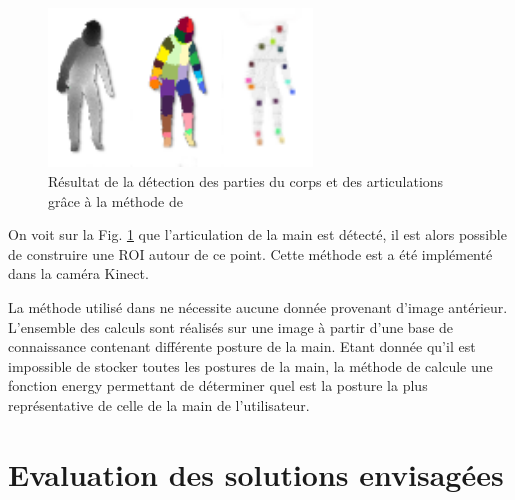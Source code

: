 \begin{figure}[!h]
 \begin{center}
  \includegraphics[width=7cm]{images/bodyrecognition.png}
  \caption{Résultat de la détection des parties du corps et des articulations grâce à la méthode de \cite{export:145347}}
  \label{fig:bodyrecognition}
 \end{center}
\end{figure}

\newpage

On voit sur la Fig. \ref{fig:bodyrecognition} que l'articulation de la main est détecté, il est alors possible de construire
une ROI autour de ce point. Cette méthode est a été implémenté dans la caméra Kinect.

La méthode utilisé dans \cite{export:238453} ne nécessite aucune donnée provenant d'image antérieur. L'ensemble
des calculs sont réalisés sur une image à partir d'une base de connaissance contenant différente posture de la
main. Etant donnée qu'il est impossible de stocker toutes les postures de la main, la méthode de \cite{export:238453}
calcule une fonction energy permettant de déterminer quel est la posture la plus représentative de celle de la main
de l'utilisateur.

\section{Evaluation des solutions envisagées}

